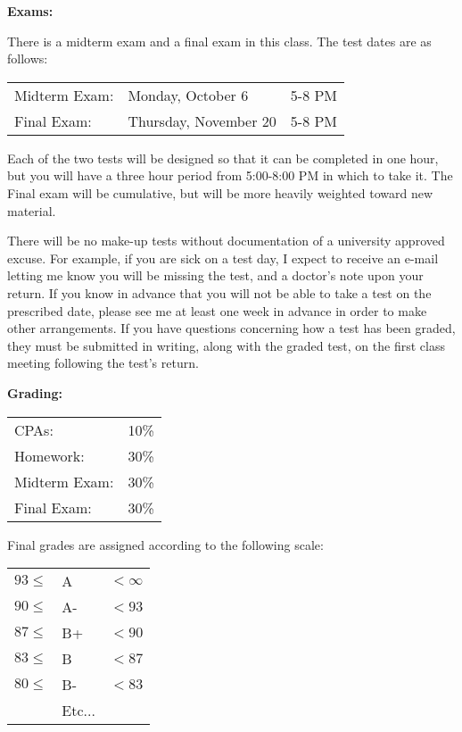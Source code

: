 \documentclass{article}
\theoremstyle{plain}
\theoremstyle{definition}
\theoremstyle{remark}
\begin{document}
\vskip0.2in
\noindent 
\begin{minipage}[t]{1.3in}
\textbf{Exams:} 
\end{minipage}
\begin{minipage}[t]{5.2in}
	There is a midterm exam and a final exam in this class. The test dates are as follows:
	\begin{center}
		\begin{tabular}{lll}
	 		Midterm Exam: & Monday, October 6 & 5-8 PM\\
		  Final Exam:   & Thursday, November 20 & 5-8 PM
	 \end{tabular}
	\end{center}
Each of the two tests will be designed so that it can be completed in one hour, but you will have a three hour period from 5:00-8:00 PM in which to take it. The Final exam will be cumulative, but will be more heavily weighted toward new material.

\vspace{0.2in}

There will be no make-up tests without documentation of a university approved excuse.  For example, if you are sick on a test day, I expect to receive an e-mail letting me know you will be missing the test, and a doctor's note upon your return.  If you know in advance that you will not be able to take a test on the prescribed date, please see me at least one week in advance in order to make other arrangements.  If you have questions concerning how a test has been graded, they must be submitted in writing, along with the graded test, on the first class meeting following the test's return.

\end{minipage}

\vskip0.4in \noindent
\begin{minipage}[t]{1.3in}
\textbf{Grading:} 
\end{minipage}
\begin{minipage}[t]{5.2in}
\begin{center}
	\begin{tabular}{ll}
	  CPAs:                 & 10\%\\
		Homework:             & 30\%\\
		Midterm Exam:         & 30\%\\
		Final Exam:           & 30\%
	\end{tabular}
\end{center}
	Final grades are assigned according to the following scale:\\
\begin{center}
\begin{tabular}{rll}
$93 \leq$ & A  &$ <\infty$\\
$90 \leq$ & A- &$ <93$\\
$87 \leq$ & B+ &$ <90$\\
$83 \leq$ & B  &$ <87$\\
$80 \leq$ & B- &$ <83$\\
&Etc...&
\end{tabular}
\end{center}
\end{minipage}
\end{document}
